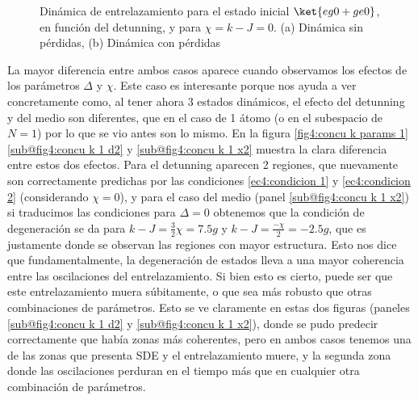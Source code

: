 \begin{figure}[h!]
\begin{subfigure}{0.49\textwidth}
        \caption{}
        \label{fig4:concu k 1 dis}
    \end{subfigure}
    \caption{Dinámica de entrelazamiento para el estado inicial $\ket{eg0+ge0}$, en función del detunning, y para $\chi=k-J=0$. (a) Dinámica sin pérdidas, (b) Dinámica con pérdidas}
    \label{fig4:concu k 1}
\end{figure}
La mayor diferencia entre ambos casos aparece cuando observamos los efectos de los parámetros $\Delta$ y $\chi$. Este caso es interesante porque nos ayuda a ver concretamente como, al tener ahora 3 estados dinámicos, el efecto del detunning y del medio son diferentes, que en el caso de 1 átomo (o en el subespacio de $N=1$) por lo que se vio antes son lo mismo. En la figura \ref{fig4:concu k params 1}\ref{sub@fig4:concu k 1 d2} y \ref{sub@fig4:concu k 1 x2} muestra la clara diferencia entre estos dos efectos. Para el detunning aparecen 2 regiones, que nuevamente son correctamente predichas por las condiciones \ref{ec4:condicion 1} y \ref{ec4:condicion 2} (considerando $\chi=0$), y para el caso del medio (panel \ref{sub@fig4:concu k 1 x2}) si traducimos las condiciones para $\Delta=0$ obtenemos que la condición de degeneración se da para $k-J=\frac{3}{2}\chi=7.5g$ y $k-J=\frac{-\chi}{2}=-2.5g$, que es justamente donde se observan las regiones con mayor estructura.
Esto nos dice que fundamentalmente, la degeneración de estados lleva a una mayor coherencia entre las oscilaciones del entrelazamiento. Si bien esto es cierto, puede ser que este entrelazamiento muera súbitamente, o que sea más robusto que otras combinaciones de parámetros. Esto se ve claramente en estas dos figuras (paneles \ref{sub@fig4:concu k 1 d2} y \ref{sub@fig4:concu k 1 x2}), donde se pudo predecir correctamente que había zonas más coherentes, pero en ambos casos tenemos una de las zonas que presenta SDE y el entrelazamiento muere, y la segunda zona donde las oscilaciones perduran en el tiempo más que en cualquier otra combinación de parámetros. 
